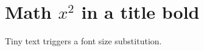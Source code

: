 \documentclass{article}
\begin{document}
\section{Math $x^2$ in a title \textbf{bold}}
{\fontsize{3}{4}\selectfont Tiny text triggers a font size substitution.}
\end{document}
